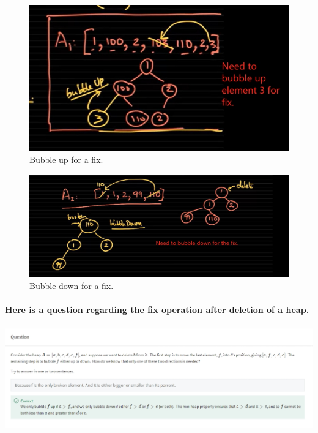\documentclass{article}
\begin{document}
\begin{figure}[h]
\includegraphics[width=\textwidth]{bubbleupafterdeletion.png}
\caption{Bubble up for a fix.}
\end{figure}

\begin{figure}[h]
\includegraphics[width=\textwidth]{bubbledownafterdeletion.png}
\caption{Bubble down for a fix.}
\end{figure}

\paragraph{Here is a question regarding the fix operation after deletion of a heap.\\}


\includegraphics[width=\textwidth]{questionofdeletion.png}
\end{document}
